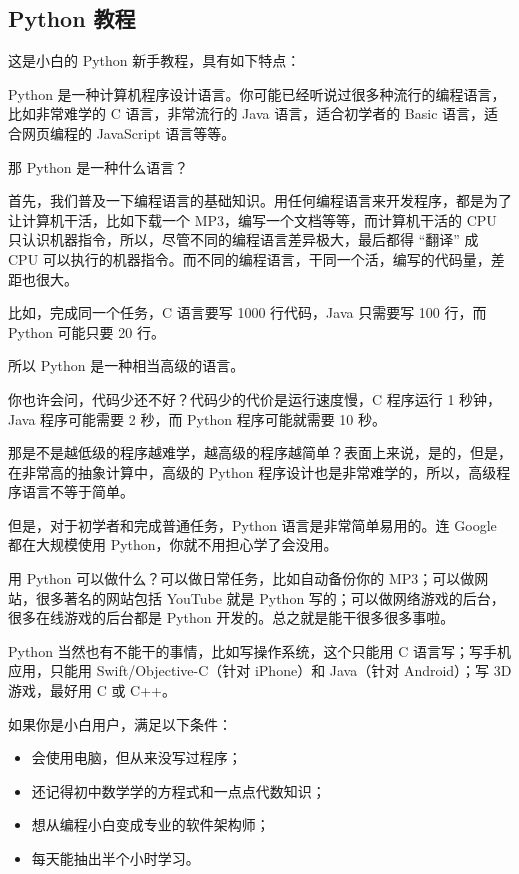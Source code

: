 \hypertarget{python-ux6559ux7a0b}{%
\subsection{Python 教程}\label{python-ux6559ux7a0b}}

这是小白的 Python 新手教程，具有如下特点：

Python
是一种计算机程序设计语言。你可能已经听说过很多种流行的编程语言，比如非常难学的
C 语言，非常流行的 Java 语言，适合初学者的 Basic 语言，适合网页编程的
JavaScript 语言等等。

那 Python 是一种什么语言？

首先，我们普及一下编程语言的基础知识。用任何编程语言来开发程序，都是为了让计算机干活，比如下载一个
MP3，编写一个文档等等，而计算机干活的 CPU
只认识机器指令，所以，尽管不同的编程语言差异极大，最后都得 ``翻译'' 成
CPU
可以执行的机器指令。而不同的编程语言，干同一个活，编写的代码量，差距也很大。

比如，完成同一个任务，C 语言要写 1000 行代码，Java 只需要写 100 行，而
Python 可能只要 20 行。

所以 Python 是一种相当高级的语言。

你也许会问，代码少还不好？代码少的代价是运行速度慢，C 程序运行 1
秒钟，Java 程序可能需要 2 秒，而 Python 程序可能就需要 10 秒。

那是不是越低级的程序越难学，越高级的程序越简单？表面上来说，是的，但是，在非常高的抽象计算中，高级的
Python 程序设计也是非常难学的，所以，高级程序语言不等于简单。

但是，对于初学者和完成普通任务，Python 语言是非常简单易用的。连 Google
都在大规模使用 Python，你就不用担心学了会没用。

用 Python 可以做什么？可以做日常任务，比如自动备份你的
MP3；可以做网站，很多著名的网站包括 YouTube 就是 Python
写的；可以做网络游戏的后台，很多在线游戏的后台都是 Python
开发的。总之就是能干很多很多事啦。

Python 当然也有不能干的事情，比如写操作系统，这个只能用 C
语言写；写手机应用，只能用 Swift/Objective-C（针对 iPhone）和 Java（针对
Android）；写 3D 游戏，最好用 C 或 C++。

如果你是小白用户，满足以下条件：

\begin{itemize}
\item
  会使用电脑，但从来没写过程序；
\item
  还记得初中数学学的方程式和一点点代数知识；
\item
  想从编程小白变成专业的软件架构师；
\item
  每天能抽出半个小时学习。
\end{itemize}

